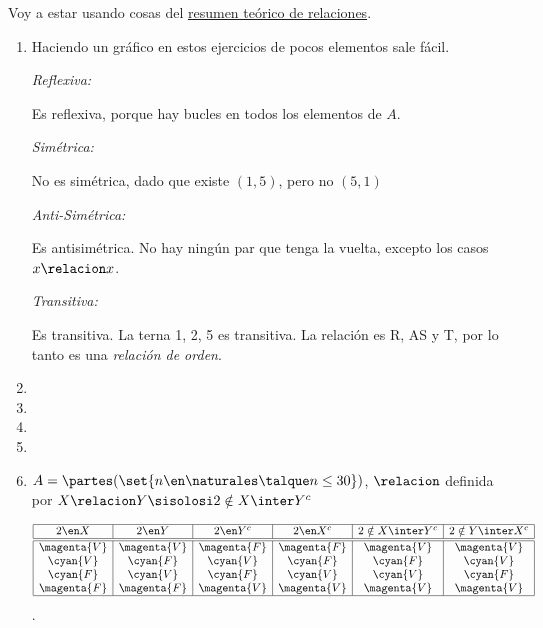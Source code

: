 Voy a estar usando cosas del \hyperlink{teoria-1:relaciones}{resumen teórico de relaciones}.

\begin{enumerate}[label=\roman*)]
  \item Haciendo un gráfico en estos ejercicios de pocos elementos sale fácil.\par

        \begin{minipage}{0.60\textwidth}
          \textit{Reflexiva:}\par
          Es reflexiva, porque hay bucles en todos los elementos de $A$.

          \textit{Simétrica:}\par
          No es simétrica, dado que existe $(1, 5)$, pero no $(5, 1)$

          \textit{Anti-Simétrica:}\par
          Es antisimétrica. No hay ningún par que tenga la vuelta, excepto los casos $x \relacion x$.

          \textit{Transitiva:}\par
          Es transitiva. La terna 1, 2, 5 es transitiva.
          La relación es R, AS y T, por lo tanto es una \textit{relación de orden}.
        \end{minipage}
        \begin{minipage}{0.3\textwidth}
          \quad  \veintidosi
        \end{minipage}

  \item \hacer

  \item \hacer
  \item \hacer
  \item \hacer
  \item $
          A =
          \partes(\set{n \en \naturales \talque n \leq 30})$, $\relacion$ definida por $X \relacion Y \sisolosi 2 \notin X \inter Y^c
        $\par
        $$
          \begin{array}{|c|c|c|c|c|c|}
            \hline
            2 \en X     & 2 \en Y     & 2 \en Y^c   & 2 \en X^c   & 2 \notin X \inter Y^c & 2 \notin Y \inter X^c \\ \hline  \hline
            \magenta{V} & \magenta{V} & \magenta{F} & \magenta{F} & \magenta{V}           & \magenta{V}           \\
            \cyan{V}    & \cyan{F}    & \cyan{V}    & \cyan{F}    & \cyan{F}              & \cyan{V}              \\
            \cyan{F}    & \cyan{V}    & \cyan{F}    & \cyan{V}    & \cyan{V}              & \cyan{F}              \\
            \magenta{F} & \magenta{F} & \magenta{V} & \magenta{V} & \magenta{V}           & \magenta{V}           \\ \hline
          \end{array}$$.


\end{enumerate}
